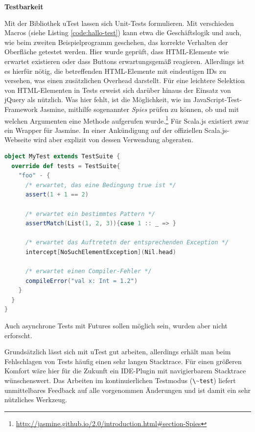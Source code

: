 \documentclass[a4paper, 12pt, hidelinks, listof=totoc, listoftables=totoc, bibliography=totoc]{scrreprt}
\newcommand{\code}[1]{\lstinline[language=Scala, style=inline]|#1|}
\newcommand{\MyMiniSec}[1]{\rmfamily\fontsize{12}{15}\selectfont
	\vspace{7pt}\textbf{#1} %
}
\begin{document}
\MyMiniSec{Testbarkeit}

Mit der Bibliothek uTest lassen sich Unit-Tests formulieren. Mit verschieden Macros (siehe Listing \ref{code:hallo-test}) kann etwa die Geschäftslogik und auch, wie beim zweiten Beispielprogramm geschehen, das korrekte Verhalten der Oberfläche getestet werden. Hier wurde geprüft, dass \ac{HTML}-Elemente wie erwartet existieren oder dass Buttons erwartungsgemäß reagieren. Allerdings ist es hierfür nötig, die betreffenden \ac{HTML}-Elemente mit eindeutigen IDs zu versehen, was einen zusätzlichen Overhead darstellt. Für eine leichtere Selektion von \ac{HTML}-Elementen in Tests erweist sich darüber hinaus der Einsatz von jQuery als nützlich. Was hier fehlt, ist die Möglichkeit, wie im JavaScript-Test-Framework Jasmine, mithilfe sogenannter \emph{Spies} prüfen zu können, ob und mit welchen Argumenten eine Methode aufgerufen wurde.\footnote{\url{http://jasmine.github.io/2.0/introduction.html\#section-Spies}} Für Scala.js existiert zwar ein Wrapper für Jasmine. In einer Ankündigung auf der offiziellen Scala.js-Webseite \cite{scalajs.ASJ} wird aber explizit von dessen Verwendung abgeraten.

\begin{lstlisting}[language=Scala, caption={Eine beispielhafte Test-Suite mit uTest.}, label={code:hallo-test}]
object MyTest extends TestSuite {
  override def tests = TestSuite{
    "foo" - {
      /* erwartet, das eine Bedingung true ist */
      assert(1 + 1 == 2)
      
      /* erwartet ein bestimmtes Pattern */
      assertMatch(List(1, 2, 3)){case 1 :: _ => }
      
      /* erwartet das Auftretetn der entsprechenden Exception */
      intercept[NoSuchElementException](Nil.head)
      
      /* erwartet einen Compiler-Fehler */
      compileError("val x: Int = 1.2")
    }
  }
}
\end{lstlisting}

Auch asynchrone Tests mit Futures sollen möglich sein, wurden aber nicht erforscht.

Grundsätzlich lässt sich mit uTest gut arbeiten, allerdings erhält man beim Fehlschlagen von Tests häufig einen sehr langen Stacktrace. Für einen größeren Komfort wäre hier für die Zukunft ein IDE-Plugin mit navigierbarem Stacktrace wünschenswert. Das Arbeiten im kontinuierlichen Testmodus (\code{\~test}) liefert unmittelbares Feedback auf alle vorgenommen Änderungen und ist damit ein sehr nützliches Werkzeug.
\end{document}
